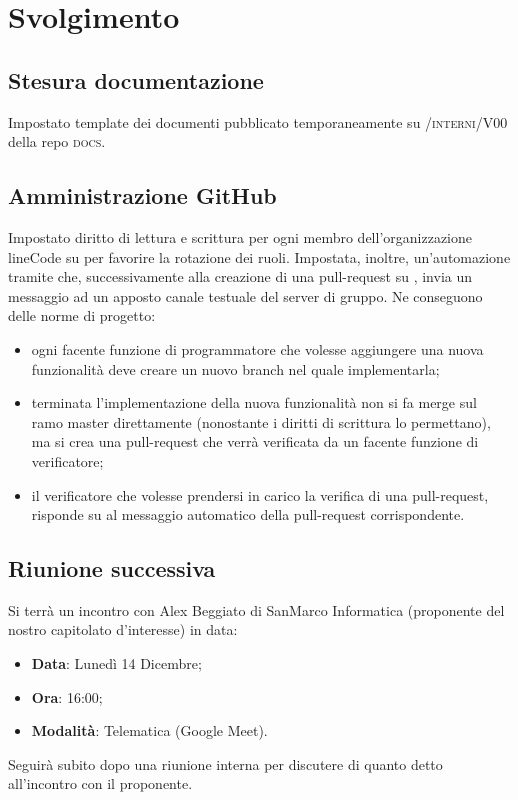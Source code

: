 \documentclass[]{article}
\begin{document}
	\newpage

	\section{Svolgimento}
	
		\subsection{Stesura documentazione}
		Impostato template dei documenti pubblicato temporaneamente su \textsc{/interni/V00} della repo \textsc{docs}.\\

		\subsection{Amministrazione GitHub}
		Impostato diritto di lettura e scrittura per ogni membro dell'organizzazione lineCode su  per favorire la rotazione dei ruoli. Impostata, inoltre, un'automazione tramite  che, successivamente alla creazione di una pull-request su , invia un messaggio ad un apposto canale testuale del server  di gruppo. Ne conseguono delle norme di progetto:
		\begin{itemize}
			\item ogni facente funzione di programmatore che volesse aggiungere una nuova funzionalità deve creare un nuovo branch nel quale implementarla;
			\item terminata l'implementazione della nuova funzionalità non si fa merge sul ramo master direttamente (nonostante i diritti di scrittura lo permettano), ma si crea una pull-request che verrà verificata da un facente funzione di verificatore;
			\item il verificatore che volesse prendersi in carico la verifica di una pull-request, risponde su  al messaggio automatico della pull-request corrispondente.\\
		\end{itemize}

		\subsection{Riunione successiva}
		Si terrà un incontro con Alex Beggiato di SanMarco Informatica (proponente del nostro capitolato d'interesse) in data:
		\begin{itemize}
			\item \textbf{Data}: Lunedì 14 Dicembre;
			\item \textbf{Ora}: 16:00;
			\item \textbf{Modalità}: Telematica (Google Meet).
		\end{itemize}
		Seguirà subito dopo una riunione interna per discutere di quanto detto all'incontro con il proponente.
		
\end{document}
